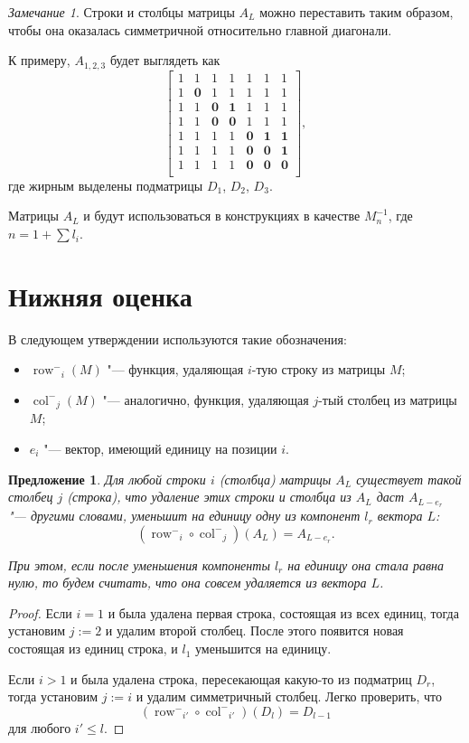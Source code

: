 \documentclass[oneside, a4paper]{article}
\newtheorem{proposition}{Предложение}
\theoremstyle{definition}
\theoremstyle{remark}
\newtheorem{remark}{Замечание}
\newcommand\rowm{\ensuremath{\operatorname{row}^-}}
\newcommand\colm{\ensuremath{\operatorname{col}^-}}
\begin{document}
\begin{remark}
Строки и столбцы матрицы $A_L$ можно переставить таким образом, чтобы она
оказалась симметричной относительно главной диагонали.
\end{remark}

К примеру, $A_{1, 2, 3}$ будет выглядеть как
\[
\begin{bmatrix}
1 & 1 & 1 & 1 & 1 & 1 & 1 \\
1 & \mathbf{0} & 1 & 1 & 1 & 1 & 1 \\
1 & 1 & \mathbf{0} & \mathbf{1} & 1 & 1 & 1 \\
1 & 1 & \mathbf{0} & \mathbf{0} & 1 & 1 & 1 \\
1 & 1 & 1 & 1 & \mathbf{0} & \mathbf{1} & \mathbf{1} \\
1 & 1 & 1 & 1 & \mathbf{0} & \mathbf{0} & \mathbf{1} \\
1 & 1 & 1 & 1 & \mathbf{0} & \mathbf{0} & \mathbf{0} \\
\end{bmatrix},
\]
где жирным выделены подматрицы $D_1$, $D_2$, $D_3$.

Матрицы $A_L$ и будут использоваться в конструкциях в качестве $M_n^{-1}$, где
$n = 1 + \sum l_i$.

\section{Нижняя оценка}

В следующем утверждении используются такие обозначения:
\begin{itemize}
\item $\rowm_i(M)$ "--- функция, удаляющая $i$-тую строку из матрицы $M$;
\item $\colm_j(M)$ "--- аналогично, функция, удаляющая $j$-тый столбец из матрицы $M$;
\item $e_i$ "--- вектор, имеющий единицу на позиции $i$.
\end{itemize}

\begin{proposition} \label{easy}
Для любой строки $i$ (столбца) матрицы $A_L$ существует такой столбец $j$
(строка), что удаление этих строки и столбца из $A_L$ даст $A_{L - e_r}$ "---
другими словами, уменьшит на единицу одну из компонент $l_r$ вектора $L$:
\[
(\rowm_i \circ \colm_j)(A_L) = A_{L - e_r}.
\]

При этом, если после уменьшения компоненты $l_r$ на единицу она стала равна нулю,
то будем считать, что она совсем удаляется из вектора $L$.
\end{proposition}
\begin{proof}
Если $i = 1$ и была удалена первая строка, состоящая из всех единиц, тогда
установим $j := 2$ и удалим второй столбец. После этого появится новая состоящая
из единиц строка, и $l_1$ уменьшится на единицу.

Если $i > 1$ и была удалена строка, пересекающая какую-то из подматриц $D_r$,
тогда установим $j := i$ и удалим симметричный столбец. Легко проверить, что
\[
(\rowm_{i'} \circ \colm_{i'})(D_l) = D_{l-1}
\]
для любого $i' \leq l$.
\end{proof}
\end{document}
